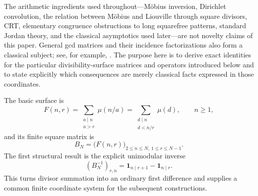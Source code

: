 \documentclass[11pt]{amsart}
\numberwithin{equation}{section}
\theoremstyle{plain}
\theoremstyle{definition}
\theoremstyle{remark}
\newcommand{\one}{\mathbf 1}
\newcommand{\mob}{\mu}
\newcommand{\Fsurf}{F}
\begin{document}
The arithmetic ingredients used throughout---Möbius inversion, Dirichlet convolution, the relation between Möbius and Liouville through square divisors, CRT, elementary congruence obstructions to long squarefree patterns, standard Jordan theory, and the classical asymptotics used later---are not novelty claims of this paper.  General gcd matrices and their incidence factorizations also form a classical subject; see, for example, \cite{Bhat1991}.  The purpose here is to derive exact identities for the particular divisibility-surface matrices and operators introduced below and to state explicitly which consequences are merely classical facts expressed in those coordinates.

The basic surface is
\begin{equation}
\Fsurf(n,r)=\sum_{\substack{a\mid n\\a>r}}\mob(n/a)
=\sum_{\substack{d\mid n\\d<n/r}}\mob(d),
\qquad n\ge1,
\label{eq:surface_small_divisors}
\end{equation}
and its finite square matrix is
\begin{equation}
B_N=\bigl(\Fsurf(n,r)\bigr)_{2\le n\le N,\ 1\le r\le N-1}.
\label{eq:BN_intro}
\end{equation}
The first structural result is the explicit unimodular inverse
\begin{equation}
(B_N^{-1})_{r,n}=\one_{n\mid r+1}-\one_{n\mid r}.
\label{eq:BN_inverse_intro}
\end{equation}
This turns divisor summation into an ordinary first difference and supplies a common finite coordinate system for the subsequent constructions.
\end{document}

